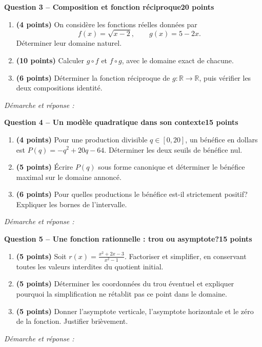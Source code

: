 \documentclass[11pt,a4paper]{article}
\begin{document}
\newpage
{\large\bfseries Question 3 -- Composition et fonction réciproque}\hfill\textbf{20 points}\par
\begin{enumerate}
\item \textbf{(4 points)} On considère les fonctions réelles données par \[f(x)=\sqrt{x-2},\qquad g(x)=5-2x.\] Déterminer leur domaine naturel.
\item \textbf{(10 points)} Calculer \(g\circ f\) et \(f\circ g\), avec le domaine exact de chacune.
\item \textbf{(6 points)} Déterminer la fonction réciproque de \(g:\mathbb R\to\mathbb R\), puis vérifier les deux compositions identité.
\end{enumerate}
\vspace{3mm}\textit{Démarche et réponse :}\par\vfill

\newpage
{\large\bfseries Question 4 -- Un modèle quadratique dans son contexte}\hfill\textbf{15 points}\par
\begin{enumerate}
\item \textbf{(4 points)} Pour une production divisible \(q\in[0,20]\), un bénéfice en dollars est \(P(q)=-q^2+20q-64\). Déterminer les deux seuils de bénéfice nul.
\item \textbf{(5 points)} Écrire \(P(q)\) sous forme canonique et déterminer le bénéfice maximal sur le domaine annoncé.
\item \textbf{(6 points)} Pour quelles productions le bénéfice est-il strictement positif? Expliquer les bornes de l’intervalle.
\end{enumerate}
\vspace{3mm}\textit{Démarche et réponse :}\par\vfill

\newpage
{\large\bfseries Question 5 -- Une fonction rationnelle : trou ou asymptote?}\hfill\textbf{15 points}\par
\begin{enumerate}
\item \textbf{(5 points)} Soit \(r(x)=\frac{x^2+2x-3}{x^2-1}\). Factoriser et simplifier, en conservant toutes les valeurs interdites du quotient initial.
\item \textbf{(5 points)} Déterminer les coordonnées du trou éventuel et expliquer pourquoi la simplification ne rétablit pas ce point dans le domaine.
\item \textbf{(5 points)} Donner l’asymptote verticale, l’asymptote horizontale et le zéro de la fonction. Justifier brièvement.
\end{enumerate}
\vspace{3mm}\textit{Démarche et réponse :}\par\vfill
\end{document}
